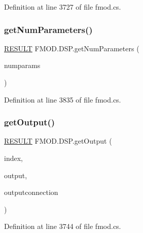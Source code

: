 Definition at line 3727 of file fmod.\+cs.

\mbox{\label{class_f_m_o_d_1_1_d_s_p_ae1438b5d53f7c2c6e7ba023c8fd8b06f}} 
\subsubsection{\texorpdfstring{get\+Num\+Parameters()}{getNumParameters()}}
{\footnotesize\ttfamily \hyperlink{namespace_f_m_o_d_a305d1176ef3f8c8815861a60407ac33d}{R\+E\+S\+U\+LT} F\+M\+O\+D.\+D\+S\+P.\+get\+Num\+Parameters (\begin{DoxyParamCaption}\item[{out int}]{numparams }\end{DoxyParamCaption})}



Definition at line 3835 of file fmod.\+cs.

\mbox{\label{class_f_m_o_d_1_1_d_s_p_ab9a4ff367880a3f11f0d9fd1b13b6471}} 
\subsubsection{\texorpdfstring{get\+Output()}{getOutput()}}
{\footnotesize\ttfamily \hyperlink{namespace_f_m_o_d_a305d1176ef3f8c8815861a60407ac33d}{R\+E\+S\+U\+LT} F\+M\+O\+D.\+D\+S\+P.\+get\+Output (\begin{DoxyParamCaption}\item[{int}]{index,  }\item[{out \hyperlink{class_f_m_o_d_1_1_d_s_p}{D\+SP}}]{output,  }\item[{out \hyperlink{class_f_m_o_d_1_1_d_s_p_connection}{D\+S\+P\+Connection}}]{outputconnection }\end{DoxyParamCaption})}



Definition at line 3744 of file fmod.\+cs.

\mbox{\label{class_f_m_o_d_1_1_d_s_p_a14c95c99fc6698bb176a85cb4d380036}} 
